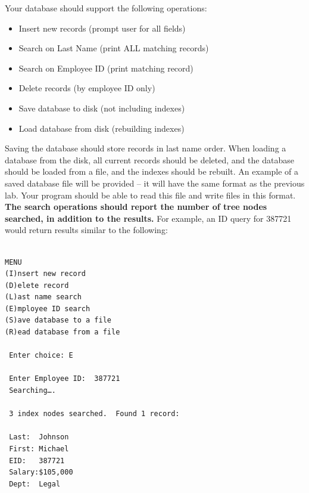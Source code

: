 \documentclass{article}
\begin{document}
Your database should support the following operations:
\begin{itemize}
\item Insert new records (prompt user for all fields)
\item Search on Last Name (print ALL matching records)
\item Search on Employee ID (print matching record)
\item Delete records (by employee ID only)
\item Save database to disk (not including indexes)
\item Load database from disk (rebuilding indexes)
\end{itemize}

Saving the database should store records in last name order.  When
loading a database from the disk, all current records should be
deleted, and the database should be loaded from a file, and the
indexes should be rebuilt.  An example of a saved database file will
be provided – it will have the same format as the previous lab.  Your
program should be able to read this file and write files in this
format. \\

\textbf{The search operations should report the number of
tree nodes searched, in addition to the results.}  For example, an ID
query for 387721 would return results similar to the following:

\begin{verbatim}

MENU
(I)nsert new record
(D)elete record
(L)ast name search
(E)mployee ID search
(S)ave database to a file
(R)ead database from a file

 Enter choice: E

 Enter Employee ID:  387721
 Searching….

 3 index nodes searched.  Found 1 record:

 Last:  Johnson
 First: Michael
 EID:   387721
 Salary:$105,000
 Dept:  Legal
\end{verbatim}
\end{document}
